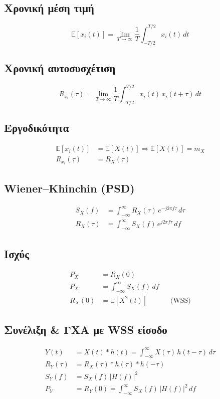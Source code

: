 \documentclass[11pt,a4paper]{article}
\newcommand{\E}{\mathbb{E}}
\begin{document}
\subsection{Χρονική μέση τιμή}
\begin{equation}
\E[x_i(t)] = \lim_{T\to\infty} \frac{1}{T}\int_{-T/2}^{T/2} x_i(t)\,dt
\end{equation}

\subsection{Χρονική αυτοσυσχέτιση}
\begin{equation}
R_{x_i}(\tau) = \lim_{T\to\infty} \frac{1}{T}\int_{-T/2}^{T/2} x_i(t)\,x_i(t+\tau)\,dt
\end{equation}

\subsection{Εργοδικότητα}
\begin{align}
\E[x_i(t)] &= \E[X(t)] \Rightarrow \E[X(t)] = m_X \\
R_{x_i}(\tau) &= R_X(\tau)
\end{align}

\subsection{Wiener--Khinchin (PSD)}
\begin{align}
S_X(f) &= \int_{-\infty}^{\infty} R_X(\tau)\,e^{-j2\pi f\tau}\,d\tau \\
R_X(\tau) &= \int_{-\infty}^{\infty} S_X(f)\,e^{j2\pi f\tau}\,df
\end{align}

\subsection{Ισχύς}
\begin{align}
P_X &= R_X(0) \\
P_X &= \int_{-\infty}^{\infty} S_X(f)\,df \\
R_X(0) &= \E[X^2(t)] && \text{(WSS)}
\end{align}

\subsection{Συνέλιξη \& ΓΧΑ με WSS είσοδο}
\begin{align}
Y(t) &= X(t) \ast h(t) = \int_{-\infty}^{\infty} X(\tau)\,h(t-\tau)\,d\tau \\
R_Y(\tau) &= R_X(\tau) \ast h(\tau) \ast h(-\tau) \\
S_Y(f) &= S_X(f)\,|H(f)|^2 \\
P_Y &= R_Y(0) = \int_{-\infty}^{\infty} S_X(f)\,|H(f)|^2\,df
\end{align}
\end{document}
